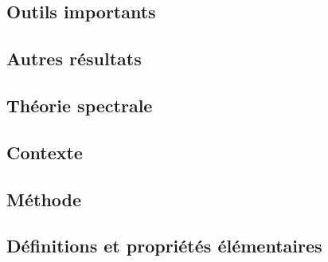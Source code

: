 \documentclass[11pt,a4paper]{article}
\begin{document}
\subsection*{Outils importants}


\subsection*{Autres résultats}


\newpage
\begin{center}  
\section*{Théorie spectrale} 
\end{center}


\subsection*{Contexte}

\subsection*{Méthode}

\subsection*{Définitions et propriétés élémentaires}

\end{document}
